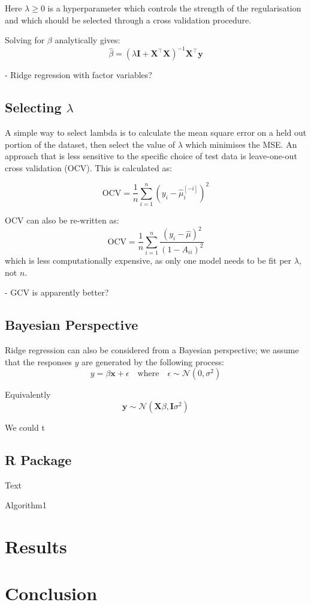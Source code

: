 \documentclass[11pt,a4paper]{article}
\begin{document}
Here $\lambda \geq 0$ is a hyperparameter which controls the strength of the regularisation and which should be selected through a cross validation procedure. 

Solving for $\beta$ analytically gives: 
$$\hat{\beta} = (\lambda \textbf{I} + \textbf{X}^{\top} \textbf{X})^{-1} \textbf{X}^{\top}\textbf{y}$$

 
- Ridge regression with factor variables?


\subsection{Selecting \texorpdfstring{$\lambda$}{l}}
A simple way to select lambda is to calculate the mean square error on a held out portion of the dataset, then select the value of $\lambda$ which minimises the MSE. An approach that is less sensitive to the specific choice of test data is leave-one-out cross validation (OCV). This is calculated as:

$$\text{OCV} = \frac{1}{n} \sum_{i=1}^n \left( y_i - \hat{\mu}_i^{[-i]} \right)^2$$

OCV can also be re-written as:
$$\text{OCV} = \frac{1}{n} \sum_{i=1}^n \frac{(y_i - \hat{\mu})^2}{(1-A_{ii})^2}$$
which is less computationally expensive, as only one model needs to be fit per $\lambda$, not $n$.

- GCV is apparently better?
 
\subsection{Bayesian Perspective}
Ridge regression can also be considered from a Bayesian perspective; we assume that the responses $y$ are generated by the following process:
$$y = \beta \textbf{x} + \epsilon \quad \text{where} \quad \epsilon \sim \mathcal{N}(0, \sigma^2)$$

Equivalently
$$ \textbf{y} \sim \mathcal{N}(\textbf{X} \beta, \textbf{I} \sigma^2) $$

We could t
 

\subsection{R Package} 


\begin{algorithm}[H] \label{alg1}
\DontPrintSemicolon
\SetAlgoLined
{}
Text\;
\caption{Algorithm1}
\end{algorithm}


\section{Results}

\section{Conclusion}

%
%

\end{document}
